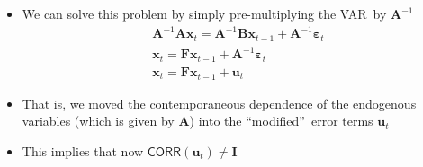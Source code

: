 \documentclass[10pt,handout]{beamer}
\begin{document}
\vspace{0.1cm}

\begin{frame}
\begin{itemize}
\item We can solve this problem by simply pre-multiplying the VAR\ by $%
\mathbf{A}^{-1}$ 
\begin{equation*}
\begin{array}{c}
\mathbf{A}^{-1}\mathbf{Ax}_{t}=\mathbf{A}^{-1}\mathbf{Bx}_{t-1}+\mathbf{A}%
^{-1}\mathbf{\varepsilon }_{t} \\ 
\mathbf{x}_{t}=\mathbf{Fx}_{t-1}+\mathbf{A}^{-1}\mathbf{\varepsilon }_{t} \\ 
\mathbf{x}_{t}=\mathbf{Fx}_{t-1}+\mathbf{u}_{t}%
\end{array}%
\end{equation*}%
\pause

\item That is, we moved the {{\color{red} contemporaneous dependence}} of
the endogenous variables (which is given by $\mathbf{A}$) into the
\textquotedblleft modified\textquotedblright\ error terms $\mathbf{u}_{t}$%
\medskip \pause

\item This implies that now $\mathsf{CORR}(\mathbf{u}_{t})\neq \mathbf{I}$
\end{itemize}
\end{frame}

\vspace{0.1cm}

\everymath\expandafter{\the\everymath \color{note!80}}
\everydisplay\expandafter{\the\everydisplay \color{note!80}}%
\end{document}
